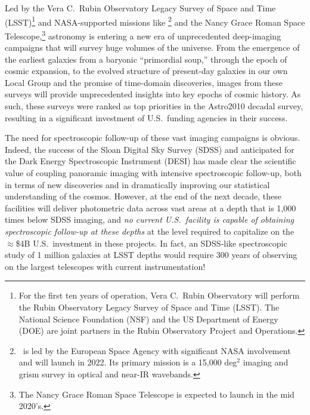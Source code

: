 \documentclass[11pt,a4paper,twoside,onecolumn,openany,final,oldfontcommands]{memoir}
\begin{document}
Led by the Vera C.~Rubin Observatory Legacy Survey of Space and Time (LSST)\footnote{For the first ten years of operation, Vera C.~Rubin Observatory will perform the Rubin Observatory Legacy Survey of Space and Time (LSST). The National Science Foundation (NSF) and the US Department of Energy (DOE) are joint partners in the Rubin Observatory Project and Operations.} and NASA-supported missions like \euclid\footnote{\euclid\ is led by the European Space Agency with significant NASA involvement and will launch in 2022. Its primary mission is a 15,000 deg$^2$ imaging and grism survey in optical and near-IR wavebands.} and the Nancy Grace Roman Space Telescope,\footnote{The Nancy Grace Roman Space Telescope is expected to launch in the mid 2020's.} astronomy is entering a new era of unprecedented deep-imaging campaigns that will survey huge volumes of the universe. From the emergence of the earliest galaxies from a baryonic ``primordial soup,'' through the epoch of cosmic expansion, to the evolved structure of present-day galaxies in our own Local Group and the promise of time-domain discoveries, images from these surveys will provide unprecedented insights into key epochs of cosmic history. As such, these surveys were ranked as top priorities in the Astro2010 decadal survey, resulting in a significant investment of U.S.\ funding agencies in their success.

The need for spectroscopic follow-up of these vast imaging campaigns is obvious.  Indeed, the success of the Sloan Digital Sky Survey (SDSS) and anticipated for the Dark Energy Spectroscopic Instrument (DESI) has made clear the scientific value of coupling panoramic imaging with intensive spectroscopic follow-up, both in terms of new discoveries and in dramatically improving our statistical understanding of the cosmos.  However, at the end of the next decade, these facilities will deliver photometric data across vast areas at a depth that is 1,000 times below SDSS imaging, and \textit{no current U.S.~facility is capable of obtaining spectroscopic follow-up at these depths} at the level required to capitalize on the $\approx$\$4B U.S.\ investment in these projects. In fact, an SDSS-like spectroscopic study of 1 million galaxies at LSST depths would require 300 years of observing on the largest telescopes with current instrumentation!
\end{document}
